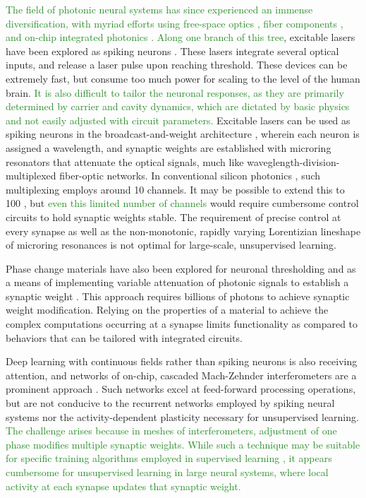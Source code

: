 \documentclass[twocolumn]{article}
\begin{document}
\textcolor{ForestGreen}{The field of photonic neural systems has since experienced an immense diversification, with myriad efforts using free-space optics \cite{habe2019}, fiber components \cite{prsh2017}, and on-chip integrated photonics \cite{shha2016,vame2014,tafe2019}. Along one branch of this tree}, excitable lasers have been explored as spiking neurons \cite{prsh2017}. These lasers integrate several optical inputs, and release a laser pulse upon reaching threshold. These devices can be extremely fast, but consume too much power for scaling to the level of the human brain. \textcolor{ForestGreen}{It is also difficult to tailor the neuronal responses, as they are primarily determined by carrier and cavity dynamics, which are dictated by basic physics and not easily adjusted with circuit parameters.} Excitable lasers can be used as spiking neurons in the broadcast-and-weight architecture \cite{tana20142}, wherein each neuron is assigned a wavelength, and synaptic weights are established with microring resonators that attenuate the optical signals, much like waveglength-division-multiplexed fiber-optic networks. In conventional silicon photonics \textcolor{ForestGreen}{\cite{li2005}}, such multiplexing employs around 10 channels. It may be possible to extend this to 100 \cite{prsh2011,tana20142}, but \textcolor{ForestGreen}{even this limited number of channels} would require cumbersome control circuits to hold synaptic weights stable. The requirement of precise control at every synapse as well as the non-monotonic, rapidly varying Lorentizian lineshape of microring resonances is not optimal for large-scale, unsupervised learning. 

Phase change materials have also been explored for neuronal thresholding \cite{chsa2018} and as a means of implementing variable attenuation of photonic signals to establish a synaptic weight \cite{chri2017}. This approach requires billions of photons to achieve synaptic weight modification. Relying on the properties of a material to achieve the complex computations occurring at a synapse limits functionality as compared to behaviors that can be tailored with integrated circuits. 

Deep learning with continuous fields rather than spiking neurons is also receiving attention, and networks of on-chip, cascaded Mach-Zehnder interferometers are a prominent approach \cite{shha2016}. Such networks excel at feed-forward processing operations, but are not conducive to the recurrent networks employed by spiking neural systems nor the activity-dependent plasticity necessary for unsupervised learning. \textcolor{ForestGreen}{The challenge arises because in meshes of interferometers, adjustment of one phase modifies multiple synaptic weights. While such a technique may be suitable for specific training algorithms employed in supervised learning \cite{humi2018}, it appears cumbersome for unsupervised learning in large neural systems, where local activity at each synapse updates that synaptic weight.}
\end{document}
